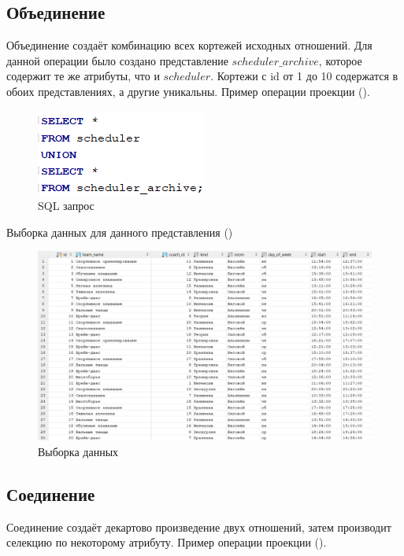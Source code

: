 \documentclass[a4paper,14pt]{article}
\begin{document}
 \subsection{Объединение}

	Объединение создаёт комбинацию всех кортежей исходных отношений.
	Для данной операции было создано представление $scheduler\_archive$, которое содержит те же атрибуты, что  и $scheduler$. Кортежи с id от 1 до 10 содержатся в обоих представлениях, а другие уникальны.
	Пример операции проекции ().
	
	\begin{figure}[H]
		\centering		
		\includegraphics[width=0.4\linewidth]{image/4_040}
		\caption{SQL запрос}\label{img:4_040}
	\end{figure}
	

	
	Выборка данных для данного представления ()
	
	\begin{figure}[H]
		\centering		
		\includegraphics[width=0.9\linewidth]{image/4_041}
		\caption{Выборка данных}\label{img:4_041}
	\end{figure}

 \subsection{Соединение}

	Соединение создаёт декартово произведение двух отношений, затем производит селекцию по некоторому атрибуту.
	Пример операции проекции ().
	
\end{document}
